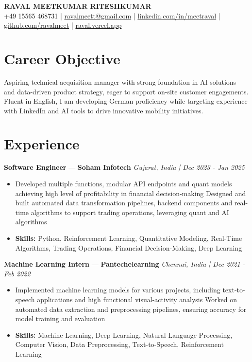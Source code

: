 \documentclass[a4paper,10pt]{article}
\begin{document}
\begin{center}
  {\Large\bfseries RAVAL MEETKUMAR RITESHKUMAR}\\[2pt]
  {\small +49 15565 468731 \;|\; \href{mailto:ravalmeett@gmail.com}{ravalmeett@gmail.com} \;|\; \href{https://www.linkedin.com/in/meetraval/}{linkedin.com/in/meetraval} \;|\; \href{https://github.com/ravalmeet}{github.com/ravalmeet} \;|\; \href{https://raval.vercel.app/}{raval.vercel.app}}
\end{center}
\vspace{-3pt}

\section*{Career Objective}
Aspiring technical acquisition manager with strong foundation in AI solutions and data-driven product strategy, eager to support on-site customer engagements. Fluent in English, I am developing German proficiency while targeting experience with LinkedIn and AI tools to drive innovative mobility initiatives.\par

\section*{Experience}
\textbf{Software Engineer} — \textbf{Soham Infotech} \hfill \textit{Gujarat, India \;|\; Dec 2023 - Jan 2025}\par
\vspace{1pt}
\begin{itemize}
  \item Developed multiple functions, modular API endpoints and quant models achieving high level of profitability in financial decision-making Designed and built automated data transformation pipelines, backend components and real-time algorithms to support trading operations, leveraging quant and AI algorithms
  \item \textbf{Skills:} Python, Reinforcement Learning, Quantitative Modeling, Real-Time Algorithms, Trading Operations, Financial Decision-Making, Deep Learning
\end{itemize}
\vspace{3pt}
\textbf{Machine Learning Intern} — \textbf{Pantechelearning} \hfill \textit{Chennai, India \;|\; Dec 2021 - Feb 2022}\par
\vspace{1pt}
\begin{itemize}
  \item Implemented machine learning models for various projects, including text-to-speech applications and high functional visual-activity analysis Worked on automated data extraction and preprocessing pipelines, ensuring accuracy for model training and evaluation
  \item \textbf{Skills:} Machine Learning, Deep Learning, Natural Language Processing, Computer Vision, Data Preprocessing, Text-to-Speech, Reinforcement Learning
\end{itemize}
\end{document}
